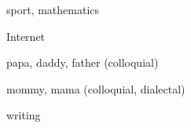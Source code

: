 \begin{flashcard}{\LARGE sport, mathematics}
\LARGE {}
\end{flashcard}
\begin{flashcard}{\LARGE Internet}
\LARGE {}
\end{flashcard}
\begin{flashcard}{\LARGE papa, daddy, father (colloquial)}
\LARGE {}
\end{flashcard}
\begin{flashcard}{\LARGE mommy, mama (colloquial, dialectal)}
\LARGE {}
\end{flashcard}
\begin{flashcard}{\LARGE writing}
\LARGE {}
\end{flashcard}

